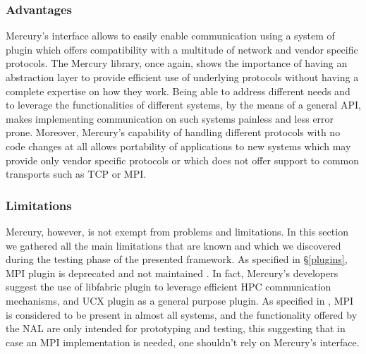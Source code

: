 \subsubsection{Advantages}
Mercury's interface allows to easily enable communication using a system of plugin which offers compatibility with a multitude of network and vendor specific protocols. The Mercury library, once again, shows the importance of having an abstraction layer to provide efficient use of underlying protocols without having a complete expertise on how they work. Being able to address different needs and to leverage the functionalities of different systems, by the means of a general API, makes implementing communication on such systems painless and less error prone. Moreover, Mercury's capability of handling different protocols with no code changes at all allows portability of applications to new systems which may provide only vendor specific protocols or which does not offer support to common transports such as TCP or MPI.

\subsubsection{Limitations}
\label{limitations}
Mercury, however, is not exempt from problems and limitations. In this section we gathered all the main limitations that are known and which we discovered during the testing phase of the presented framework. As specified in \S\ref{plugins}, MPI plugin is deprecated and not maintained \cite{git_mercury_mpi}. In fact, Mercury's developers suggest the use of libfabric plugin to leverage efficient HPC communication mechanisms, and UCX plugin as a general purpose plugin. As specified in \cite{nal_guide}, MPI is considered to be present in almost all systems, and the functionality offered by the NAL are only intended for prototyping and testing, this suggesting that in case an MPI implementation is needed, one shouldn't rely on Mercury's interface.\newline

